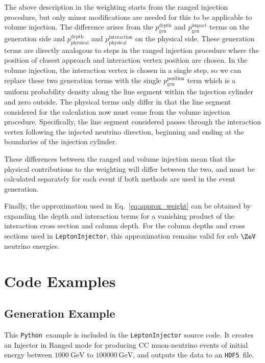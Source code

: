 \documentclass[main.tex]{subfiles}
\newcommand{\LeptonInjector}{\texttt{LeptonInjector}}
\newcommand{\Python}{\texttt{Python }}
\newcommand{\hdf}{\texttt{HDF5}}
\begin{document}
The above description in the weighting starts from the ranged injection procedure, but only minor modifications are needed for this to be applicable to volume injection.
The difference arises from the $p_\textrm{gen}^\textrm{depth}$ and $p_\textrm{gen}^\textrm{impact}$ terms on the generation side and $p_\textrm{physical}^\textrm{depth}$ and $p_\textrm{physical}^\textrm{interaction}$ on the physical side.
These generation terms are directly analogous to steps in the ranged injection procedure where the position of closest approach and interaction vertex position are chosen.
In the volume injection, the interaction vertex is chosen in a single step, so we can replace these two generation terms with the single $p_\textrm{gen}^\textrm{position}$ term which is a uniform probability density along the line segment within the injection cylinder and zero outside.
The physical terms only differ in that the line segment considered for the calculation now must come from the volume injection procedure.
Specifically, the line segment considered passes through the interaction vertex following the injected neutrino direction, beginning and ending at the boundaries of the injection cylinder.

These differences between the ranged and volume injection mean that the physical contributions to the weighting will differ between the two, and must be calculated separately for each event if both methods are used in the event generation.

Finally, the approximation used in Eq.~\ref{eq:approx_weight} can be obtained by expanding the depth and interaction terms for a vanishing product of the interaction cross section and column depth.
For the column depths and cross sections used in \LeptonInjector{}, this approximation remains valid for sub $\si\ZeV$ neutrino energies.

\section{Code Examples}

\subsection{Generation Example\label{sec:example_generation}}

This \Python example is included in the \LeptonInjector{} source code.
It creates an Injector in Ranged mode for producing CC muon-neutrino events of initial energy between $\SI{1000}\GeV$ to $\SI{100000}\GeV$, and outputs the data to an \hdf~file.
\end{document}
